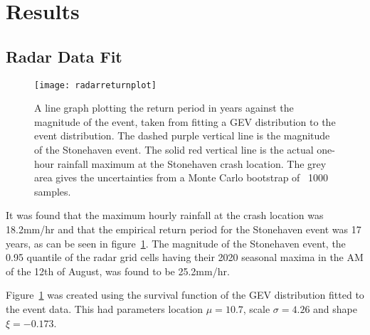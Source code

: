 \section{Results}\label{sec:results}

\begin{comment}
This section should detail the obtained results in a clear,
easy-to-follow manner. It is important to make clear what are original
results and what are repeats of previous calculations or computations.
Remember that long tables of numbers are just as boring to read as
they are to type-in!

Use graphs to present your results wherever practicable.

Results or computations should be presented with uncertainties
(errors), both statistical and systematic where applicable.

Be selective in what you include: half a dozen \emph{e.g.}~tables that
contain wrong data you collected while you forgot to switch on the
computer are not relevant and may mask the correct results.
\end{comment}

\subsection{Radar Data Fit}\label{subsec:radardatafit}

\begin{figure}[H]
    \texttt{[image: radarreturnplot]}
    \caption{A line graph plotting the return period in years against the magnitude of the event,
        taken from fitting a GEV distribution to the event distribution.
    The dashed purple vertical line is the magnitude of the Stonehaven event.
    The solid red vertical line is the actual one-hour rainfall maximum at the Stonehaven crash location.
    The grey area gives the uncertainties from a Monte Carlo bootstrap of ~1000 samples.}
    \label{fig:radarreturnplot}
\end{figure}

It was found that the maximum hourly rainfall at the crash location was 18.2mm/hr and
    that the empirical return period for the Stonehaven event was 17 years,
    as can be seen in figure~\ref{fig:radarreturnplot}.
The magnitude of the Stonehaven event,
    the 0.95 quantile of the radar grid cells having their 2020 seasonal maxima in the AM of the 12th of August,
    was found to be 25.2mm/hr.

Figure~\ref{fig:radarreturnplot} was created using the survival function of the GEV distribution fitted to the event data.
This had parameters location $\mu = 10.7$, scale $\sigma = 4.26$ and shape $\xi = -0.173$.

